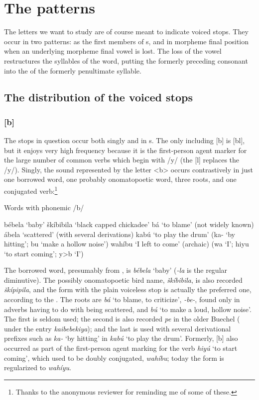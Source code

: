 \documentclass[output=paper]{LSP/langsci}
\begin{document}
\section{The patterns}

The letters we want to study are of course meant to indicate voiced stops. They occur in two patterns: as the first members of s, and in morpheme final position when an underlying morpheme final vowel is lost. The loss of the vowel restructures the syllables of the word, putting the formerly preceding consonant into the  of the formerly penultimate syllable.

\subsection{The distribution of the voiced stops}

\subsubsection{[b]}

The stops in question occur both singly and in s. The only  including [b] is [bl], but it enjoys very high frequency because it is the first-person agent marker for the large number of common verbs which begin with /y/ (the [l] replaces the /y/). Singly, the sound represented by the letter <b> occurs contrastively in just one borrowed word, one probably onomatopoetic word, three roots, and one conjugated verb:\footnote{Thanks to the anonymous reviewer for reminding me of some of these.}

\begin{exe} \label{ex:rood:1}
\ex Words with phonemic /b/
\begin{xlist}
\ex b\'ebela `baby'
\ex \v{s}k\'ibibila `black capped chickadee'
\ex b\'a `to blame' (not widely known)
\ex \'abela `scattered' (with several derivations)
\ex kab\'u `to play the drum' (ka- `by hitting'; bu `make a hollow noise')
\ex wah\'ibu `I left to come' (archaic) (wa `I'; hiyu `to start coming'; y>b `I')
\end{xlist}
\end{exe} 

The borrowed word, presumably from , is \textit{b\'ebela} `baby' (\textit{-la} is the regular  diminutive). The possibly onomatopoetic bird name, \textit{\v{s}k\'ibibila}, is also recorded \textit{\v{s}k\'ipipila}, and the form with the plain voiceless stop is actually the preferred one, according to the . The roots are \textit{b\'a} `to blame, to criticize', \textit{-be-}, found only in adverbs having to do with being scattered, and \textit{b\'u} `to make a loud, hollow noise'. The first is seldom used; the second is also recorded \textit{pe} in the older Buechel  (\citealt[278]{Buechel1970} under the entry \textit{kaibebekiya}); and the last is used with several derivational prefixes such as \textit{ka-} `by hitting' in \textit{kab\'u} `to play the drum'. Formerly, [b] also occurred as part of the first-person agent marking for the verb \textit{hiy\'u} `to start coming', which used to be doubly conjugated, \textit{wah\'ibu}; today the form is regularized to \textit{wah\'iyu}.
\end{document}
